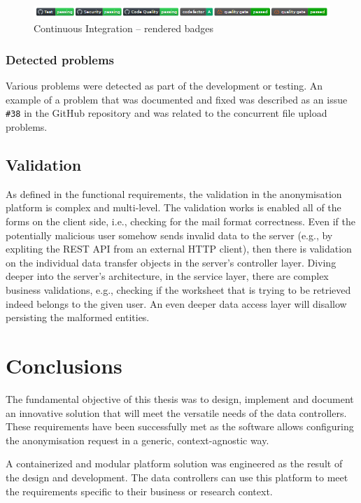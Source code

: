 \documentclass[a4paper,twoside,12pt]{book}
\begin{document}
\begin{figure}
  \centering
  \includegraphics[width=\linewidth]{img/ci_badges.png}
  \caption{Continuous Integration – rendered badges}
  \label{fig:ci_badges}
\end{figure}

\subsection{Detected problems}
Various problems were detected as part of the development or testing. An example of a problem that was documented and fixed was described as an issue \verb|#38| in the GitHub repository and was related to the concurrent file upload problems.

\section{Validation}


As defined in the functional requirements, the validation in the anonymisation platform is complex and multi-level. The validation works is enabled all of the forms on the client side, i.e., checking for the mail format correctness. Even if the potentially malicious user somehow sends invalid data to the server (e.g., by expliting the REST API from an external HTTP client), then there is validation on the individual data transfer objects in the server's controller layer. Diving deeper into the server's architecture, in the service layer, there are complex business validations, e.g., checking if the worksheet that is trying to be retrieved indeed belongs to the given user. An even deeper data access layer will disallow persisting the malformed entities.


\chapter{Conclusions}

The fundamental objective of this thesis was to design, implement and document an innovative solution that will meet the versatile needs of the data controllers. These requirements have been successfully met as the software allows configuring the anonymisation request in a generic, context-agnostic way. 

A containerized and modular platform solution was engineered as the result of the design and development. The data controllers can use this platform to meet the requirements specific to their business or research context.
\end{document}
